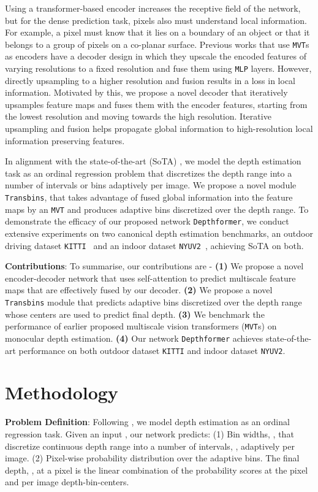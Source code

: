 \documentclass{article}
\newcommand{\myfirstpara}[1]{\noindent \textbf{#1}:}
\newcommand{\mypara}[1]{\vspace{0.5em} \myfirstpara{#1}}
\newcommand{\Depthformer}{\texttt{Depthformer}\xspace}
\newcommand{\KITTI}{\texttt{KITTI}\xspace}
\newcommand{\NYU}{\texttt{NYUV2}\xspace}
\newcommand{\Transbins}{\texttt{Transbins}\xspace}
\newcommand{\MLP}{\texttt{MLP}\xspace}
\newcommand{\MVT}{\texttt{MVT}\xspace}
\newcommand{\MVTs}{\texttt{MVT}s\xspace}
\begin{document}
Using a transformer-based encoder increases the receptive field of the network, but for the dense prediction task, pixels also must understand local information. For example, a pixel must know that it lies on a boundary of an object or that it belongs to a group of pixels on a co-planar surface. Previous works that use \MVTs \cite{segformer} as encoders have a decoder design in which they upscale the encoded features of varying resolutions to a fixed resolution and fuse them using \MLP layers. However, directly upsampling to a higher resolution and fusion results in a loss in local information. Motivated by this, we propose a novel decoder that iteratively upsamples feature maps and fuses them with the encoder features, starting from the lowest resolution and moving towards the high resolution. Iterative upsampling and fusion helps propagate global information to high-resolution local information preserving features. 

In alignment with the state-of-the-art (SoTA) \cite{adabins}, we model the depth estimation task as an ordinal regression problem that discretizes the depth range into a number of intervals or bins adaptively per image. We propose a novel module \Transbins, that takes advantage of fused global information into the feature maps by an \MVT and produces adaptive bins discretized over the depth range.
To demonstrate the efficacy of our proposed network \Depthformer, we conduct extensive experiments on two canonical depth estimation benchmarks, an outdoor driving dataset \KITTI~\cite{kitti} and an indoor dataset \NYU~\cite{nyu}, achieving SoTA on both. 

\mypara{Contributions} 
To summarise, our contributions are - \textbf{(1)} We propose a novel encoder-decoder network that uses self-attention to predict multiscale feature maps that are effectively fused by our decoder. \textbf{(2)} We propose a novel \Transbins module that predicts adaptive bins discretized over the depth range whose centers are used to predict final depth. \textbf{(3)} We benchmark the performance of earlier proposed multiscale vision transformers (\MVTs) on monocular depth estimation. \textbf{(4)} Our network \Depthformer achieves state-of-the-art performance on both outdoor dataset \KITTI and indoor dataset \NYU.

 


\section{Methodology}
\label{sec:methodology}
\myfirstpara{Problem Definition}
Following \cite{adabins, DORN}, we model depth estimation as an ordinal regression task. Given an input , our network predicts: (1) Bin widths, , that discretize continuous depth range into a number of intervals, , adaptively per image. (2) Pixel-wise probability distribution over the adaptive bins. The final depth, , at a pixel is the linear combination of the probability scores at the pixel and per image depth-bin-centers.  
\end{document}
